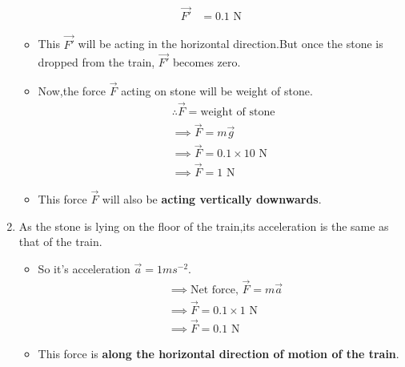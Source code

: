 \documentclass[journal,12pt,twocolumn]{IEEEtran}
\begin{document}
\begin{enumerate}[label=\alph*.)]
\begin{align}
 \\
 \vec{F'}&=0.1\text{ N}
\end{align}
\begin{itemize}
\item This $\vec{F'}$ will be acting in the horizontal direction.But once the stone is dropped from the train, $\vec{F'}$ becomes zero.
\item Now,the force $\vec{F}$ acting on stone will be weight of stone.
\begin{align}
&\therefore \vec{F} =\text{weight of stone }
\\
&\implies \vec{F}=m\vec{g}
\\
&\implies \vec{F}=0.1\times10 \text{ N}
\\
&\implies \vec{F}=1\text{ N}
\end{align}
\item This force $\vec{F}$ will also be \textbf{acting vertically downwards}.
\end{itemize}
\item As the stone is lying on the floor of the train,its acceleration is the same as that of the train. 
\begin{itemize}
    \item So it's acceleration $\vec{a} = 1 ms^{-2}$.
\begin{align}
&\implies \text{Net force, }\vec{F}=m\vec{a}
\\
&\implies \vec{F}=0.1\times1 \text{ N}
\\
&\implies \vec{F}=0.1\text{ N}
\end{align}
\item This force is \textbf{along the horizontal direction of motion of the train}.
\end{itemize}
\end{enumerate}
\end{document}

